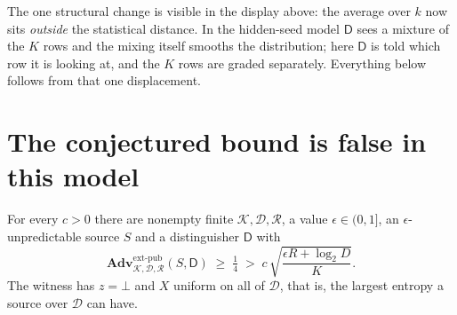 \documentclass{conjura-solution}
\newcommand{\Adv}{\mathbf{Adv}}
\newcommand{\extp}{\mathrm{ext}\text{-}\mathrm{pub}}
\newcommand{\calK}{\mathcal{K}}
\newcommand{\calD}{\mathcal{D}}
\newcommand{\calR}{\mathcal{R}}
\begin{document}
The one structural change is visible in the display above: the average over $k$ now sits
\emph{outside} the statistical distance. In the hidden-seed model $\mathsf{D}$ sees a mixture of
the $K$ rows and the mixing itself smooths the distribution; here $\mathsf{D}$ is told which row it
is looking at, and the $K$ rows are graded separately. Everything below follows from that one
displacement.

\section{The conjectured bound is false in this model}\label{sec:false}

\begin{proposition}\label{prop:false}
For every $c > 0$ there are nonempty finite $\calK, \calD, \calR$, a value $\epsilon \in (0,1]$, an
$\epsilon$-unpredictable source $S$ and a distinguisher $\mathsf{D}$ with
\[
  \Adv^{\extp}_{\calK,\calD,\calR}(S,\mathsf{D}) \;\ge\; \tfrac14
  \;>\; c\,\sqrt{\frac{\epsilon R + \log_2 D}{K}} .
\]
The witness has $z = \bot$ and $X$ uniform on all of $\calD$, that is, the largest entropy a
source over $\calD$ can have.
\end{proposition}
\end{document}
